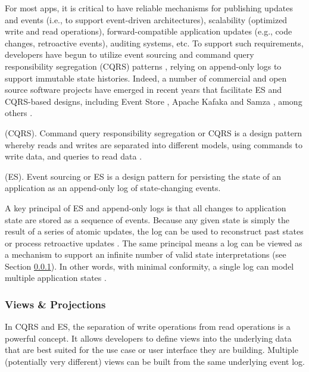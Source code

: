 \documentclass{textile}
\begin{document}
For most apps, it is critical to have reliable mechanisms for publishing updates and events (i.e., to support event-driven architectures), scalability (optimized write and read operations), forward-compatible application updates (e.g., code changes, retroactive events), auditing systems, etc. To support such requirements, developers have begun to utilize event sourcing and command query responsibility segregation (CQRS) patterns \cite{bettsExploringCQRSEvent2013}, relying on append-only logs to support immutable state histories. Indeed, a number of commercial and open source software projects have emerged in recent years that facilitate ES and CQRS-based designs, including Event Store \cite{EventStore}, Apache Kafaka \cite{ApacheKafka} and Samza \cite{ApacheSamza}, among others \cite{kleppmannDesigningDataintensiveApplications2017}. 

\begin{definition}
  (CQRS). Command query responsibility segregation or CQRS is a design pattern whereby reads and writes are separated into different models, using commands to write data, and queries to read data \cite{martinfowlerCQRS2011}.
\end{definition}

\begin{definition}
  (ES). Event sourcing or ES is a design pattern for persisting the state of an application as an append-only log of state-changing events.
\end{definition}

A key principal of ES and append-only logs is that all changes to application state are stored as a sequence of events. Because any given state is simply the result of a series of atomic updates, the log can be used to reconstruct past states or process retroactive updates \cite{fowlerEventSourcing}. The same principal means a log can be viewed as a mechanism to support an infinite number of valid state interpretations (see Section  \ref{sec:ViewsProjections}). In other words, with minimal conformity, a single log can model multiple application states \cite{microsoftcorporationAzureApplicationArchitecture}.

\subsubsection{Views \& Projections} \label{sec:ViewsProjections}

In CQRS and ES, the separation of write operations from read operations is a powerful concept. It allows developers to define views into the underlying data that are best suited for the use case or user interface they are building. Multiple (potentially very different) views can be built from the same underlying event log.
\end{document}
